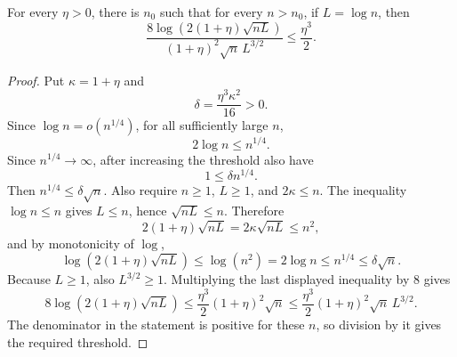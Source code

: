 \begin{helper}
For every \(\eta>0\), there is \(n_0\) such that for every \(n>n_0\), if
\(L=\log n\), then
\[
\frac{8\log(2(1+\eta)\sqrt{nL})}
{(1+\eta)^2\sqrt n\,L^{3/2}}
\le\frac{\eta^3}{2}.
\]
\end{helper}
\begin{proof}
Put \(\kappa=1+\eta\) and
\[
\delta=\frac{\eta^3\kappa^2}{16}>0.
\]
Since \(\log n=o(n^{1/4})\), for all sufficiently large \(n\),
\[
2\log n\le n^{1/4}.
\]
Since \(n^{1/4}\to\infty\), after increasing the threshold also have
\[
1\le \delta n^{1/4}.
\]
Then \(n^{1/4}\le \delta\sqrt n\).  Also require \(n\ge1\), \(L\ge1\), and
\(2\kappa\le n\).  The inequality \(\log n\le n\) gives \(L\le n\), hence
\(\sqrt{nL}\le n\).  Therefore
\[
2(1+\eta)\sqrt{nL}=2\kappa\sqrt{nL}\le n^2,
\]
and by monotonicity of \(\log\),
\[
\log(2(1+\eta)\sqrt{nL})\le \log(n^2)=2\log n\le n^{1/4}
\le \delta\sqrt n.
\]
Because \(L\ge1\), also \(L^{3/2}\ge1\).  Multiplying the last displayed
inequality by \(8\) gives
\[
8\log(2(1+\eta)\sqrt{nL})
\le \frac{\eta^3}{2}(1+\eta)^2\sqrt n
\le \frac{\eta^3}{2}(1+\eta)^2\sqrt n\,L^{3/2}.
\]
The denominator in the statement is positive for these \(n\), so division by
it gives the required threshold.
\end{proof}
